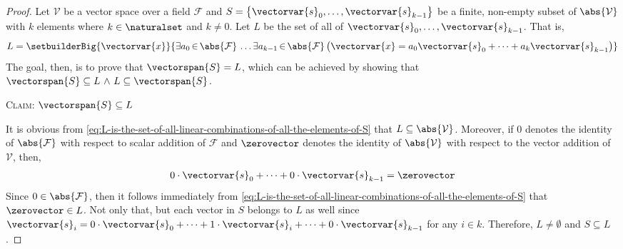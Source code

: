 \begin{proof}
    Let \( \mathcal{V} \) be a vector space over a field \( \mathcal{F} \) and \( S = \mleft\{ \vectorvar{s}_{0}, \dots, \vectorvar{s}_{k-1} \mright\} \)
    be a finite, non-empty subset of \( \abs{\mathcal{V}} \) with \( k \) elements where \( k \in \naturalset \) and \( k \neq 0 \). Let \( L \) be the set
    of all  of \( \vectorvar{s}_{0}, \dots, \vectorvar{s}_{k-1} \). That is,
    \begin{equation}
        \label{eq:L-is-the-set-of-all-linear-combinations-of-all-the-elements-of-S}
        L = \setbuilderBig{\vectorvar{x}}{
            \exists a_{0}\,{\in}\,\abs{\mathcal{F}} \, \dots \exists a_{k-1}\,{\in}\,\abs{\mathcal{F}} \,
            \big( \vectorvar{x} = a_{0}\vectorvar{s}_{0} + \cdots + a_{k}\vectorvar{s}_{k-1} \big)}
    \end{equation}
    The goal, then, is to prove that \( \vectorspan{S} = L \), which can be achieved by showing that \( \vectorspan{S} \subseteq L \,\,{\land}\,\, L \subseteq \vectorspan{S} \).

    \vspace{0.5cm}
    \noindent
    {\scshape Claim:} \( \vectorspan{S} \subseteq L \)

    \vspace{0.1cm}
    \noindent
    It is obvious from \eqref{eq:L-is-the-set-of-all-linear-combinations-of-all-the-elements-of-S} that \( L \subseteq \abs{\mathcal{V}} \). Moreover,
    if \( 0 \) denotes the identity of \( \abs{\mathcal{F}} \) with respect to scalar addition of \( \mathcal{F} \) and
    \( \zerovector \) denotes the identity of \( \abs{\mathcal{V}} \) with respect to the vector addition of \( \mathcal{V} \), then,
    \begin{gather*}
        0 \cdot \vectorvar{s}_{0} + \cdots + 0 \cdot \vectorvar{s}_{k-1} = \zerovector
    \end{gather*}
    Since \( 0 \in \abs{\mathcal{F}} \), then it follows immediately from \eqref{eq:L-is-the-set-of-all-linear-combinations-of-all-the-elements-of-S}
    that \( \zerovector \in L \). Not only that, but each vector in \( S \) belongs to \( L \) as well since
    \( \vectorvar{s}_{i} = 0\cdot\vectorvar{s}_{0} + \cdots + 1\cdot\vectorvar{s}_{i} + \cdots + 0\cdot\vectorvar{s}_{k-1} \) for any \( i \in k \).
    Therefore, \( L \neq \emptyset \) and \( S \subseteq L \).


\end{proof}

